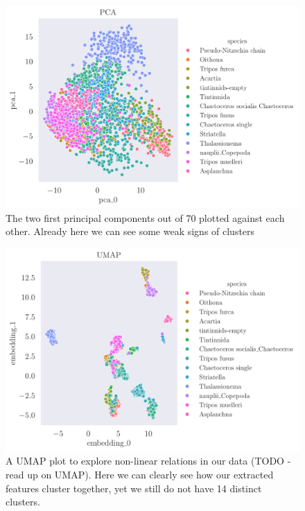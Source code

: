 \begin{figure}[H]
    \centering
    \includegraphics[width=1.1\linewidth]{examples/tests_eb/figs/pca0_pca1.pdf}
    \caption{The two first principal components out of 70 plotted against each other. Already here we can see some weak signs of clusters}
    \label{fig:pca0pca1}
\end{figure}

\begin{figure}[H]
    \centering
    \includegraphics[width=1.1\linewidth]{examples/tests_eb/figs/umap.pdf}
    \caption{A UMAP plot to explore non-linear relations in our data (TODO - read up on UMAP). Here we can clearly see how our extracted features cluster together, yet we still do not have 14 distinct clusters.}
    \label{fig:umap}
\end{figure}

